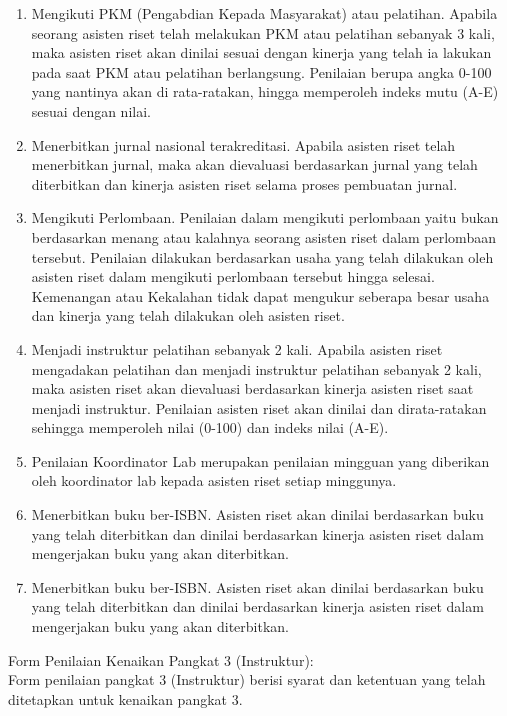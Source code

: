\begin{enumerate}
 \item Mengikuti PKM (Pengabdian Kepada Masyarakat) atau pelatihan. Apabila seorang asisten riset telah melakukan PKM atau pelatihan sebanyak 3 kali, maka asisten riset akan dinilai sesuai dengan kinerja yang telah ia lakukan pada saat PKM atau pelatihan berlangsung. Penilaian berupa angka 0-100 yang nantinya akan di rata-ratakan, hingga memperoleh indeks mutu (A-E) sesuai dengan nilai.
 \item Menerbitkan jurnal nasional terakreditasi. Apabila asisten riset telah menerbitkan jurnal, maka akan dievaluasi berdasarkan jurnal yang telah diterbitkan dan kinerja asisten riset selama proses pembuatan jurnal.
 \item Mengikuti Perlombaan. Penilaian dalam mengikuti perlombaan yaitu bukan berdasarkan menang atau kalahnya seorang asisten riset dalam perlombaan tersebut. Penilaian dilakukan berdasarkan usaha yang telah dilakukan oleh asisten riset dalam mengikuti perlombaan tersebut hingga selesai. Kemenangan atau Kekalahan tidak dapat mengukur seberapa besar usaha dan kinerja yang telah dilakukan oleh asisten riset.
 \item Menjadi instruktur pelatihan sebanyak 2 kali. Apabila asisten riset mengadakan pelatihan dan menjadi instruktur pelatihan sebanyak 2 kali, maka asisten riset akan dievaluasi berdasarkan kinerja asisten riset saat menjadi instruktur. Penilaian asisten riset akan dinilai dan dirata-ratakan sehingga memperoleh nilai (0-100) dan indeks nilai (A-E).
 \item Penilaian Koordinator Lab merupakan penilaian mingguan yang diberikan oleh koordinator lab kepada asisten riset setiap minggunya.
 \item Menerbitkan buku ber-ISBN. Asisten riset akan dinilai berdasarkan buku yang telah diterbitkan dan dinilai berdasarkan kinerja asisten riset dalam mengerjakan buku yang akan diterbitkan.
 \item Menerbitkan buku ber-ISBN. Asisten riset akan dinilai berdasarkan buku yang telah diterbitkan dan dinilai berdasarkan kinerja asisten riset dalam mengerjakan buku yang akan diterbitkan.
\end{enumerate}
Form Penilaian Kenaikan Pangkat 3 (Instruktur):\\
Form penilaian pangkat 3 (Instruktur) berisi syarat dan ketentuan yang telah ditetapkan untuk kenaikan pangkat 3.\\
